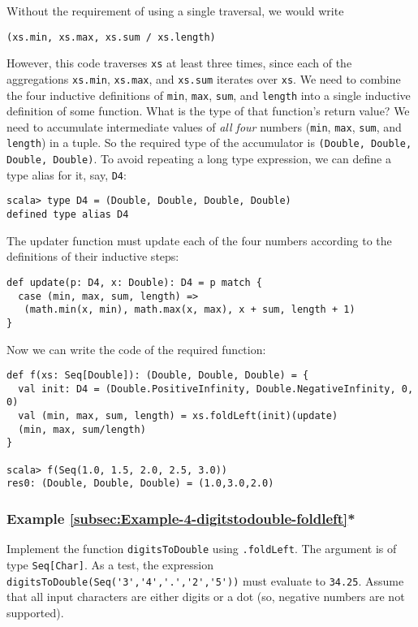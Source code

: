 Without the requirement of using a single traversal, we would write
\begin{lstlisting}
(xs.min, xs.max, xs.sum / xs.length)
\end{lstlisting}
However, this code traverses \lstinline!xs! at least three times,
since each of the aggregations \lstinline!xs.min!, \lstinline!xs.max!,
and \lstinline!xs.sum! iterates over \lstinline!xs!. We need to
combine the four inductive definitions of \lstinline!min!, \lstinline!max!,
\lstinline!sum!, and \lstinline!length! into a single inductive
definition of some function. What is the type of that function's return
value? We need to accumulate intermediate values of \emph{all four}
numbers (\lstinline!min!, \lstinline!max!, \lstinline!sum!, and
\lstinline!length!) in a tuple. So the required type of the accumulator
is \lstinline!(Double, Double, Double, Double)!. To avoid repeating
a long type expression, we can define a type alias
for it, say, \lstinline!D4!:
\begin{lstlisting}
scala> type D4 = (Double, Double, Double, Double)
defined type alias D4 
\end{lstlisting}
The updater function must update each of the four numbers according
to the definitions of their inductive steps:
\begin{lstlisting}
def update(p: D4, x: Double): D4 = p match {
  case (min, max, sum, length) =>
   (math.min(x, min), math.max(x, max), x + sum, length + 1)
}
\end{lstlisting}
Now we can write the code of the required function:
\begin{lstlisting}
def f(xs: Seq[Double]): (Double, Double, Double) = {
  val init: D4 = (Double.PositiveInfinity, Double.NegativeInfinity, 0, 0)
  val (min, max, sum, length) = xs.foldLeft(init)(update)
  (min, max, sum/length)
}

scala> f(Seq(1.0, 1.5, 2.0, 2.5, 3.0))
res0: (Double, Double, Double) = (1.0,3.0,2.0)
\end{lstlisting}


\subsubsection{Example \label{subsec:Example-4-digitstodouble-foldleft}\ref{subsec:Example-4-digitstodouble-foldleft}{*}}

Implement the function \lstinline!digitsToDouble! using \lstinline!.foldLeft!.
The argument is of type \lstinline!Seq[Char]!. As a test, the expression
\lstinline!digitsToDouble(Seq('3','4','.','2','5'))! must evaluate
to \lstinline!34.25!. Assume that all input characters are either
digits or a dot (so, negative numbers are not supported).

